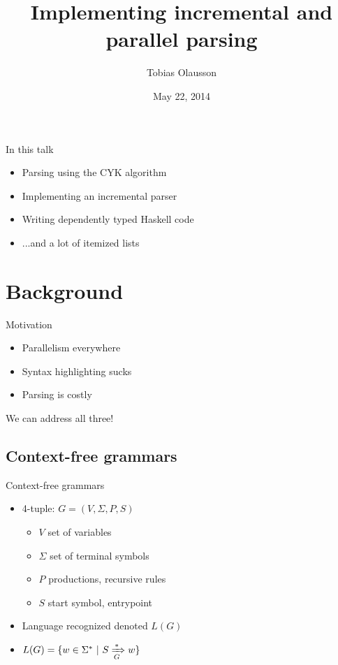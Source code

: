 \documentclass{beamer}
\title{Implementing incremental and parallel parsing}
\author{Tobias Olausson}
\institute{University of Gothenburg}
\date{May 22, 2014}
\begin{document}
\begin{frame}
\titlepage
\end{frame}

\begin{frame}{In this talk}
    \begin{itemize}
        \item Parsing using the CYK algorithm
        \item Implementing an incremental parser
        \item Writing dependently typed Haskell code
        \item ...and a lot of itemized lists
    \end{itemize}
\end{frame}

\section{Background}
\begin{frame}{Motivation}
    \begin{itemize}
        \item Parallelism everywhere
        \item Syntax highlighting sucks
        \item Parsing is costly
    \end{itemize}
    We can address all three!
\end{frame}

\subsection{Context-free grammars}
\begin{frame}{Context-free grammars}
    \begin{itemize}
        \item 4-tuple: $G = (V, \Sigma, P, S)$
        \begin{itemize}
            \item $V$ set of variables
            \item $\Sigma$ set of terminal symbols
            \item $P$ productions, recursive rules
            \item $S$ start symbol, entrypoint
        \end{itemize}
        \item Language recognized denoted $L(G)$
        \item $L(G) = \{w \in \Sigma^* \ |\  S \xRightarrow[G]{*} w\}$
    \end{itemize}
\end{frame}
\end{document}

